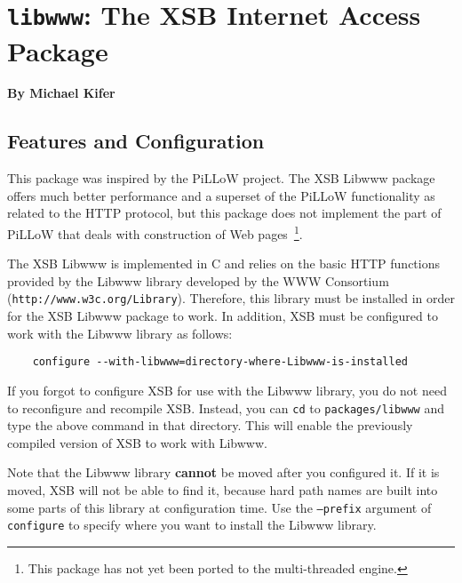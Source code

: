 \chapter{{\tt libwww}: The XSB Internet Access Package}
\label{chap-libwww}

\begin{center}
{\Large {\bf By Michael Kifer}}
\end{center}


\section{Features and Configuration}
This package was inspired by the PiLLoW project.  The XSB Libwww
package offers much better performance and a superset of the PiLLoW
functionality as related to the HTTP protocol, but this package does
not implement the part of PiLLoW that deals with construction of Web
pages~\footnote{This package has not yet been ported to the
  multi-threaded engine.}.

The XSB Libwww is implemented in C and relies on the basic HTTP functions
provided by the Libwww library developed by the WWW Consortium
(\verb|http://www.w3c.org/Library|). Therefore, this library must be
installed in order for the XSB Libwww package to work. In addition, XSB
must be configured to work with the Libwww library as follows:
\begin{verbatim}
    configure --with-libwww=directory-where-Libwww-is-installed  
\end{verbatim}
If you forgot to configure XSB for use with the Libwww library, you do not
need to reconfigure and recompile XSB. Instead, you can {\tt cd} to
{\tt packages/libwww} and type the above command in that directory.
This will enable the previously compiled version of XSB to work with
Libwww.

Note that the Libwww library {\bf cannot} be moved after you configured it.
If it is moved, XSB will not be able to find it, because hard path names
are built into some parts of this library at configuration time. Use the
{\tt --prefix} argument of {\tt configure} to specify where you want to
install the Libwww library.

